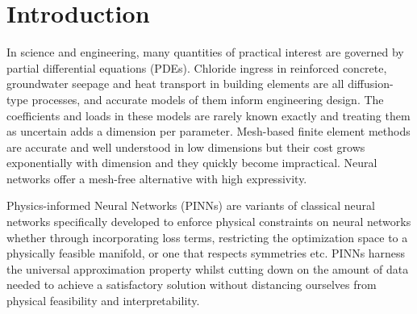 \section{Introduction}
\label{sec:intro}

%

In science and engineering, many quantities of practical interest are governed by partial differential equations (PDEs). Chloride ingress in reinforced concrete, groundwater seepage and heat transport in building elements are all diffusion-type processes, and accurate models of them inform engineering design. The coefficients and loads in these models are rarely known exactly and treating them as uncertain adds a dimension per parameter. Mesh-based finite element methods are accurate and well understood in low dimensions but their cost grows exponentially with dimension and they quickly become impractical. Neural networks offer a mesh-free alternative with high expressivity.

Physics-informed Neural Networks (PINNs) are variants of classical neural networks specifically developed to enforce physical constraints on neural networks whether through incorporating loss terms, restricting the optimization space to a physically feasible manifold, or one that respects symmetries etc. PINNs harness the universal approximation property whilst cutting down on the amount of data needed to achieve a satisfactory solution without distancing ourselves from physical feasibility and interpretability. 
